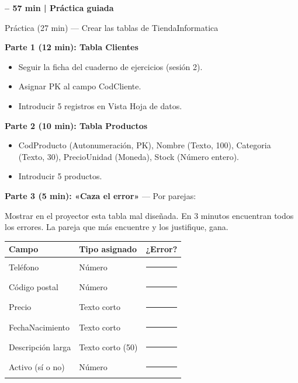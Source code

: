 \documentclass[12pt,a4paper]{article}
\newcommand{\tiempo}[1]{%
  \vspace{4pt}
  \begin{tcolorbox}[
    colback=timercolor!12, colframe=timercolor,
    left=4pt, right=4pt, top=3pt, bottom=3pt,
    boxrule=1pt, sharp corners, breakable, enhanced]
  \textbf{\large\textcolor{timercolor}{\faIcon{clock}\quad #1}}
  \end{tcolorbox}\vspace{2pt}}
\begin{document}
\tiempo{30 – 57 min \normalfont\normalsize |  Práctica guiada}

\begin{practbox}{\quad Práctica (27 min) — Crear las tablas de TiendaInformatica}

\textbf{Parte 1 (12 min): Tabla Clientes}
\begin{itemize}[leftmargin=1.8em]
  \item Seguir la ficha del cuaderno de ejercicios (sesión 2).
  \item Asignar PK al campo CodCliente.
  \item Introducir 5 registros en Vista Hoja de datos.
\end{itemize}

\textbf{Parte 2 (10 min): Tabla Productos}
\begin{itemize}[leftmargin=1.8em]
  \item CodProducto (Autonumeración, PK), Nombre (Texto, 100), Categoria (Texto, 30),
        PrecioUnidad (Moneda), Stock (Número entero).
  \item Introducir 5 productos.
\end{itemize}

\textbf{Parte 3 (5 min): «Caza el error»} — Por parejas:

\begin{center}
\begin{tcolorbox}[colback=chalkred!20, colframe=accessred, sharp corners,
                  left=6pt, right=6pt, breakable, enhanced]
\small Mostrar en el proyector esta tabla mal diseñada.
En 3 minutos encuentran todos los errores. La pareja que más encuentre y los justifique, gana.

\medskip
\renewcommand{\arraystretch}{1.2}
\begin{tabular}{|l|l|l|}
\hline
\rowcolor{darkblue!60}
\color{white}\bfseries Campo & \color{white}\bfseries Tipo asignado & \color{white}\bfseries ¿Error? \\
\hline
Teléfono & Número & \rule{3cm}{0.4pt} \\
\hline
\rowcolor{chalk}
Código postal & Número & \rule{3cm}{0.4pt} \\
\hline
Precio & Texto corto & \rule{3cm}{0.4pt} \\
\hline
\rowcolor{chalk}
FechaNacimiento & Texto corto & \rule{3cm}{0.4pt} \\
\hline
Descripción larga & Texto corto (50) & \rule{3cm}{0.4pt} \\
\hline
\rowcolor{chalk}
Activo (sí o no) & Número & \rule{3cm}{0.4pt} \\
\hline
\end{tabular}
\end{tcolorbox}
\end{center}


\end{practbox}
\end{document}
